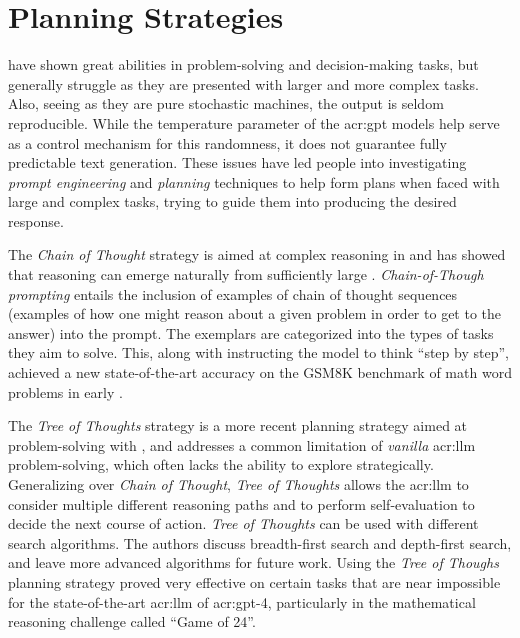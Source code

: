 \section{Planning Strategies}\label{sec:planning-strategies}

 have shown great abilities in problem-solving and decision-making tasks, but generally struggle as they are presented with larger and more complex tasks. Also, seeing as they are pure stochastic machines, the output is seldom reproducible. While the temperature parameter of the \acrshort{acr:gpt} models help serve as a control mechanism for this randomness, it does not guarantee fully predictable text generation. These issues have led people into investigating \textit{prompt engineering} and \textit{planning} techniques to help  form plans when faced with large and complex tasks, trying to guide them into producing the desired response.

The \textit{Chain of Thought} strategy \citep{weiChainofThoughtPromptingElicits2023} is aimed at complex reasoning in  and has showed that reasoning can emerge naturally from sufficiently large .  \textit{Chain-of-Though prompting} entails the inclusion of examples of chain of thought sequences (examples of how one might reason about a given problem in order to get to the answer) into the prompt. The exemplars are categorized into the types of tasks they aim to solve. This, along with instructing the model to think \enquote{step by step}, achieved a new state-of-the-art accuracy on the GSM8K benchmark of math word problems in early \citeyear{weiChainofThoughtPromptingElicits2023}.

The \textit{Tree of Thoughts} strategy \citep{yaoTreeThoughtsDeliberate2023} is a more recent planning strategy aimed at problem-solving with , and addresses a common limitation of \textit{vanilla} \acrshort{acr:llm} problem-solving, which often lacks the ability to explore strategically. Generalizing over \textit{Chain of Thought}, \textit{Tree of Thoughts} allows the \acrshort{acr:llm} to consider multiple different reasoning paths and to perform self-evaluation to decide the next course of action. \textit{Tree of Thoughts} can be used with different search algorithms. The authors discuss breadth-first search and depth-first search, and leave more advanced algorithms for future work. Using the \textit{Tree  of Thoughs} planning strategy proved very effective on certain tasks that are near impossible for the state-of-the-art \acrshort{acr:llm} of \acrshort{acr:gpt}-4, particularly in the mathematical reasoning challenge called \enquote{Game of 24}.

